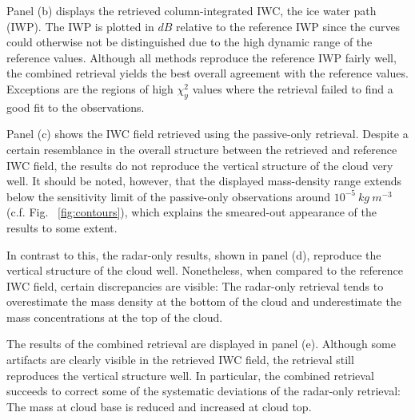\documentclass[journal abbreviation, manuscript]{copernicus}
\begin{document}
Panel (b) displays the retrieved column-integrated IWC, the ice water path
(IWP). The IWP is plotted in $\unit{dB}$ relative to the reference IWP since the
curves could otherwise not be distinguished due to the high dynamic range of the
reference values. Although all methods reproduce the reference IWP fairly well, the
combined retrieval yields the best overall agreement with the reference values.
Exceptions are the regions of high $\chi^2_y$ values where the retrieval failed
to find a good fit to the observations.

Panel (c) shows the IWC field retrieved using the passive-only retrieval.
Despite a certain resemblance in the overall structure between the retrieved and
reference IWC field, the results do not reproduce the vertical structure of the
cloud very well. It should be noted, however, that the displayed mass-density
range extends below the sensitivity limit of the passive-only observations
around $10^{-5}\ \unit{kg\ m^{-3}}$ (c.f. Fig. ~\ref{fig:contours}), which explains
the smeared-out appearance of the results to some extent.

In contrast to this, the radar-only results, shown in panel (d), reproduce the
vertical structure of the cloud well. Nonetheless, when compared to the
reference IWC field, certain discrepancies are visible: The radar-only retrieval
tends to overestimate the mass density at the bottom of the cloud and
underestimate the mass concentrations at the top of the cloud.

The results of the combined retrieval are displayed in panel (e). Although some
artifacts are clearly visible in the retrieved IWC field, the retrieval still
reproduces the vertical structure well. In particular, the combined retrieval
succeeds to correct some of the systematic deviations of the radar-only
retrieval: The mass at cloud base is reduced and increased at cloud top.
\end{document}
